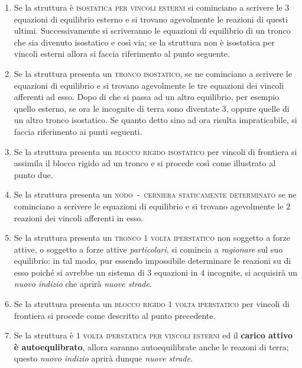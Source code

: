 \begin{enumerate}
\item Se la struttura è \textsc{isostatica per vincoli esterni} si cominciano a scrivere le $3$ equazioni di equilibrio esterno e si trovano agevolmente le reazioni di questi ultimi. Successivamente si scriveranno le equazioni di equilibrio di un tronco che sia divenuto isostatico e così via; se la struttura non è isostatica per vincoli esterni allora si faccia riferimento al punto seguente.
\item Se la struttura presenta un \textsc{tronco isostatico}, se ne cominciano a scrivere le equazioni di equilibrio e si trovano agevolmente le tre equazioni dei vincoli afferenti ad esso. Dopo di che si passa ad un altro equilibrio, per esempio quello esterno, se ora le incognite di terra sono diventate $3$, oppure quelle di un altro tronco isostatico. Se quanto detto sino ad ora risulta impraticabile, si faccia riferimento ai punti seguenti.
\item Se la struttura presenta un \textsc{blocco rigido isostatico} per vincoli di frontiera si assimila il blocco rigido ad un tronco e si procede così come illustrato al punto due. 
\item Se la struttura presenta un \textsc{nodo~-~cerniera staticamente determinato} se ne cominciano a scrivere le equazioni di equilibrio e si trovano agevolmente le $2$ reazioni dei vincoli afferenti in esso. 
\item Se la struttura presenta un \textsc{tronco $1$ volta iperstatico} non soggetto a forze attive, o soggetto a forze attive \emph{particolari}, si comincia a \emph{ragionare} sul suo equilibrio: in tal modo, pur essendo impossibile determinare le reazioni su di esso poiché si avrebbe un sistema di $3$ equazioni in $4$ incognite, si acquisirà un \emph{nuovo indizio} che aprirà \emph{nuove strade}. 
\item Se la struttura presenta un \textsc{blocco rigido $1$ volta iperstatico} per vincoli di frontiera si procede come descritto al punto precedente.
\item Se la struttura è \textsc{$1$ volta iperstatica per vincoli esterni} ed il \textbf{carico attivo è autoequlibrato}, allora saranno autoequilibrate anche le reazoni di terra; questo \emph{nuovo indizio} aprirà dunque \emph{nuove strade}.
\end{enumerate}
